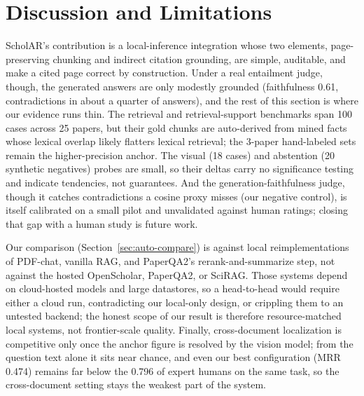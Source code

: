\documentclass[letterpaper]{article} %
\begin{document}
\section{Discussion and Limitations}
ScholAR's contribution is a local-inference integration whose two elements, page-preserving
chunking and indirect citation grounding, are simple, auditable, and make a cited page correct
by construction. Under a real entailment judge, though, the generated answers are only modestly
grounded (faithfulness 0.61, contradictions in about a quarter of answers), and the rest of this
section is where our evidence runs thin. The retrieval and retrieval-support benchmarks span 100 cases
across 25 papers, but their gold chunks are auto-derived from mined facts whose lexical overlap
likely flatters lexical retrieval; the 3-paper hand-labeled sets remain the higher-precision
anchor. The visual (18 cases) and abstention (20 synthetic negatives) probes are small, so their
deltas carry no significance testing and indicate tendencies, not guarantees. And the
generation-faithfulness judge, though it catches contradictions a cosine proxy misses (our negative
control), is itself calibrated on a small pilot and unvalidated against human ratings; closing that
gap with a human study is future work.

Our comparison (Section~\ref{sec:auto-compare}) is against local reimplementations of
PDF-chat, vanilla RAG, and PaperQA2's rerank-and-summarize step, not against the
hosted OpenScholar, PaperQA2, or SciRAG. Those systems depend on cloud-hosted models
and large datastores, so a head-to-head would require either a cloud run, contradicting
our local-only design, or crippling them to an untested backend; the honest scope of
our result is therefore resource-matched local systems, not frontier-scale quality.
Finally, cross-document localization is competitive only once the anchor figure is
resolved by the vision model; from the question text alone it sits near chance, and even
our best configuration (MRR 0.474) remains far below the 0.796 of expert humans on the
same task, so the cross-document setting stays the weakest part of the system.

\end{document}
